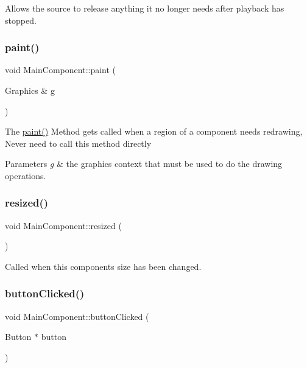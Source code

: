 Allows the source to release anything it no longer needs after playback has stopped. \mbox{\label{class_main_component_a42262770b7a79a2f5ac650aa96a3a45c}} 
\subsubsection{\texorpdfstring{paint()}{paint()}}
{\footnotesize\ttfamily void Main\+Component\+::paint (\begin{DoxyParamCaption}\item[{Graphics \&}]{g }\end{DoxyParamCaption})\hspace{0.3cm}{\ttfamily [override]}}

The \mbox{\hyperlink{class_main_component_a42262770b7a79a2f5ac650aa96a3a45c}{paint()}} Method gets called when a region of a component needs redrawing, Never need to call this method directly


\begin{DoxyParams}{Parameters}
{\em g} & the graphics context that must be used to do the drawing operations. \\
\hline
\end{DoxyParams}
\mbox{\label{class_main_component_a339148bc43089300e10d5883a0a80726}} 
\subsubsection{\texorpdfstring{resized()}{resized()}}
{\footnotesize\ttfamily void Main\+Component\+::resized (\begin{DoxyParamCaption}{ }\end{DoxyParamCaption})\hspace{0.3cm}{\ttfamily [override]}}

Called when this component\textquotesingle{}s size has been changed. \mbox{\label{class_main_component_a88cdd4473b3fd8054e3805fb70c323ff}} 
\subsubsection{\texorpdfstring{buttonClicked()}{buttonClicked()}}
{\footnotesize\ttfamily void Main\+Component\+::button\+Clicked (\begin{DoxyParamCaption}\item[{Button $\ast$}]{button }\end{DoxyParamCaption})\hspace{0.3cm}{\ttfamily [override]}}

